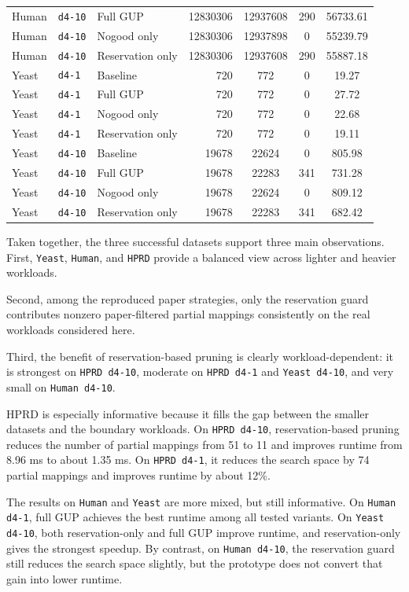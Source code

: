 \begin{longtable}{lllrccc}
  Human & \texttt{d4-10} & Full GUP & 12830306 & 12937608 & 290 & 56733.61 \\
  Human & \texttt{d4-10} & Nogood only & 12830306 & 12937898 & 0 & 55239.79 \\
  Human & \texttt{d4-10} & Reservation only & 12830306 & 12937608 & 290 & 55887.18 \\
  \midrule
  Yeast & \texttt{d4-1} & Baseline & 720 & 772 & 0 & 19.27 \\
  Yeast & \texttt{d4-1} & Full GUP & 720 & 772 & 0 & 27.72 \\
  Yeast & \texttt{d4-1} & Nogood only & 720 & 772 & 0 & 22.68 \\
  Yeast & \texttt{d4-1} & Reservation only & 720 & 772 & 0 & 19.11 \\
  \midrule
  Yeast & \texttt{d4-10} & Baseline & 19678 & 22624 & 0 & 805.98 \\
  Yeast & \texttt{d4-10} & Full GUP & 19678 & 22283 & 341 & 731.28 \\
  Yeast & \texttt{d4-10} & Nogood only & 19678 & 22624 & 0 & 809.12 \\
  Yeast & \texttt{d4-10} & Reservation only & 19678 & 22283 & 341 & 682.42 \\
  \bottomrule
\end{longtable}

Taken together, the three successful datasets support three main observations. First, \texttt{Yeast}, \texttt{Human}, and \texttt{HPRD} provide a balanced view across lighter and heavier workloads.

Second, among the reproduced paper strategies, only the reservation guard contributes nonzero paper-filtered partial mappings consistently on the real workloads considered here.

Third, the benefit of reservation-based pruning is clearly workload-dependent: it is strongest on \texttt{HPRD d4-10}, moderate on \texttt{HPRD d4-1} and \texttt{Yeast d4-10}, and very small on \texttt{Human d4-10}.

HPRD is especially informative because it fills the gap between the smaller datasets and the boundary workloads. On \texttt{HPRD d4-10}, reservation-based pruning reduces the number of partial mappings from 51 to 11 and improves runtime from 8.96 ms to about 1.35 ms. On \texttt{HPRD d4-1}, it reduces the search space by 74 partial mappings and improves runtime by about 12\%.

The results on \texttt{Human} and \texttt{Yeast} are more mixed, but still informative. On \texttt{Human d4-1}, full GUP achieves the best runtime among all tested variants. On \texttt{Yeast d4-10}, both reservation-only and full GUP improve runtime, and reservation-only gives the strongest speedup. By contrast, on \texttt{Human d4-10}, the reservation guard still reduces the search space slightly, but the prototype does not convert that gain into lower runtime.

